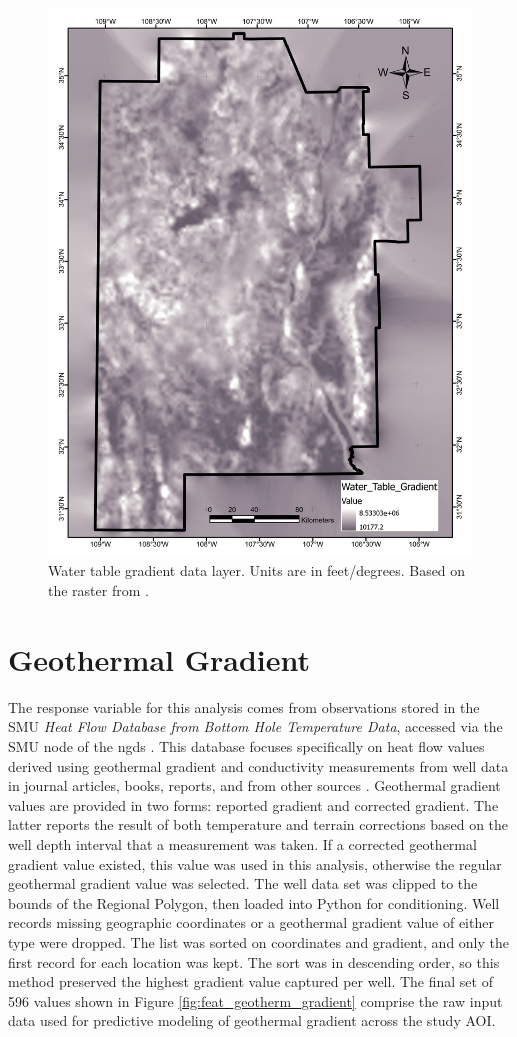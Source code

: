 \begin{figure}[H]
\centering
\includegraphics[width=0.75\linewidth]{templates/images/Figure-WTGradient.pdf}
\caption[Water table gradient data layer]{Water table gradient data layer. Units are in feet/degrees. Based on the raster from \protect\citet{bielicki_hydrogeolgic_2015}.}
\label{fig:feat_wt_gradient}
\end{figure}
\pagebreak

\section{Geothermal Gradient}\label{app:dl_geothermal_gradient}
The response variable for this analysis comes from observations stored in the SMU \textit{Heat Flow Database from Bottom Hole Temperature Data}, accessed via the SMU node of the \acrlong{ngds} \citep{smu_geothermal_2021}. This database focuses specifically on heat flow values derived using geothermal gradient and conductivity measurements from well data in journal articles, books, reports, and from other sources \citep{blackwell_geothermal_2014}. Geothermal gradient values are provided in two forms: reported gradient and corrected gradient. The latter reports the result of both temperature and terrain corrections based on the well depth interval that a measurement was taken. If a corrected geothermal gradient value existed, this value was used in this analysis, otherwise the regular geothermal gradient value was selected. The well data set was clipped to the bounds of the Regional Polygon, then loaded into Python for conditioning. Well records missing geographic coordinates or a geothermal gradient value of either type were dropped. The list was sorted on coordinates and gradient, and only the first record for each location was kept. The sort was in descending order, so this method preserved the highest gradient value captured per well. The final set of 596 values shown in Figure \ref{fig:feat_geotherm_gradient} comprise the raw input data used for predictive modeling of geothermal gradient across the study AOI.
\vfill
\pagebreak

